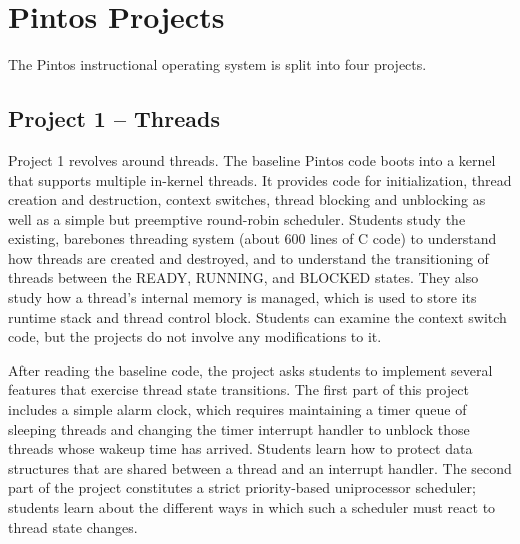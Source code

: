 \section{Pintos Projects}
\label{sec:assignments}

The Pintos instructional operating system is split into four projects.
\pintostestcounttable{}

%
%

\subsection{Project 1 -- Threads}
Project 1 revolves around threads.  The baseline Pintos code boots into a kernel that
supports multiple in-kernel threads.  It provides code for initialization, thread creation and
destruction, context switches, thread blocking and unblocking as well as a simple but
preemptive round-robin scheduler.
Students study the existing, barebones threading system (about 600 lines of C code) to 
understand how threads are created and destroyed, and to understand the transitioning of 
threads between the READY, RUNNING, and BLOCKED states.  They also study how a thread's
internal memory is managed, which is used to store its runtime stack and thread control block.
Students can examine the context switch code, but the projects do not involve any modifications
to it.

After reading the baseline code, the project asks students to implement several features
that exercise thread state transitions.  The first part of this project includes a simple
alarm clock, which requires maintaining a timer queue of sleeping threads and changing 
the timer interrupt handler to unblock those threads whose wakeup time has arrived.
Students learn how to protect data structures that are shared between a thread and an
interrupt handler.  The second part of the project constitutes a strict priority-based
uniprocessor scheduler; students learn about the different ways in which 
such a scheduler must react to thread state changes.

